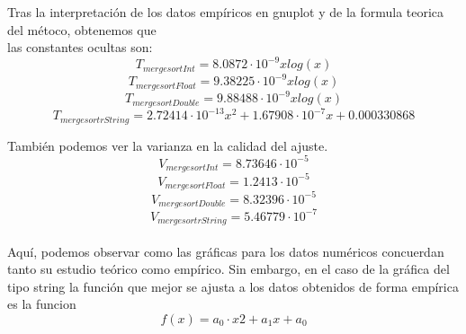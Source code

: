 \documentclass[11pt]{article}
\begin{document}
Tras la interpretación de los datos empíricos en gnuplot y de la formula teorica del métoco, obtenemos que \\
las constantes ocultas son:
\begin{equation*}
    T_{mergesortInt}=8.0872\cdot 10^{-9}x log(x)
\end{equation*}
\begin{equation*}
    T_{mergesortFloat}=9.38225\cdot 10^{-9}x log(x)
\end{equation*}
\begin{equation*}
    T_{mergesortDouble}=9.88488\cdot 10^{-9}x log(x)
\end{equation*}
\begin{equation*}
    T_{mergesortrString}=2.72414 \cdot 10^{-13}x^{2}+1.67908 \cdot 10^{-7}x+0.000330868 
\end{equation*}

También podemos ver la varianza en la calidad del ajuste. 
\begin{equation*}
    V_{mergesortInt}=8.73646\cdot 10^{-5}
\end{equation*}
\begin{equation*}
    V_{mergesortFloat}=1.2413\cdot 10^{-5}
\end{equation*}
\begin{equation*}
    V_{mergesortDouble}=8.32396 \cdot 10^{-5}
\end{equation*}
\begin{equation*}
    V_{mergesortrString}=5.46779 \cdot 10^{-7}
\end{equation*}
\\
Aquí, podemos observar como las gráficas para los datos numéricos concuerdan tanto su estudio teórico como 
empírico. Sin embargo, en el caso de la gráfica del tipo string la función que mejor se ajusta a los datos
obtenidos de forma empírica es la funcion 
\begin{equation*}
    f(x)=a_0 \cdot x{2} + a_1 x + a_0
\end{equation*}
\end{document}
